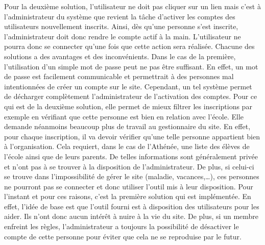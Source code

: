 \documentclass[12pt, a4paper, oneside]{article}
\begin{document}
    Pour la deuxième solution, l'utilisateur ne doit pas cliquer sur un lien mais c'est à l'administrateur du système que revient la tâche d'activer les comptes des utilisateurs nouvellement inscrits. Ainsi, dès qu'une personne s'est inscrite, l'administrateur doit donc rendre le compte actif à la main. L'utilisateur ne pourra donc se connecter qu'une fois que cette action sera réalisée. Chacune des solutions a des avantages et des inconvénients. Dans le cas de la première, l'utilisation d'un simple mot de passe peut ne pas être suffisant. En effet, un mot de passe est facilement communicable et permettrait à des personnes mal intentionnées de créer un compte sur le site. Cependant, un tel système permet de décharger complètement l'administrateur de l'activation des comptes. Pour ce qui est de la deuxième solution, elle permet de mieux filtrer les inscriptions par exemple en vérifiant que cette personne est bien en relation avec l'école. Elle demande néanmoins beaucoup plus de travail au gestionnaire du site. En effet, pour chaque inscription, il va devoir vérifier qu'une telle personne appartient bien à l'organisation. Cela requiert, dans le cas de l'Athénée, une liste des élèves de l'école ainsi que de leurs parents. De telles informations sont généralement privée et n'ont pas à se trouver à la disposition de l'administrateur. De plus, si celui-ci se trouve dans l'impossibilité de gérer le site (maladie, vacances,\dots), ces personnes ne pourront pas se connecter et donc utiliser l'outil mis à leur disposition. Pour l'instant et pour ces raisons, c'est la première solution qui est implémentée. En effet, l'idée de base est que l'outil fourni est à disposition des utilisateurs pour les aider. Ils n'ont donc aucun intérêt à nuire à la vie du site. De plus, si un membre enfreint les règles, l'administrateur a toujours la possibilité de désactiver le compte de cette personne pour éviter que cela ne se reproduise par le futur.
    
\end{document}
